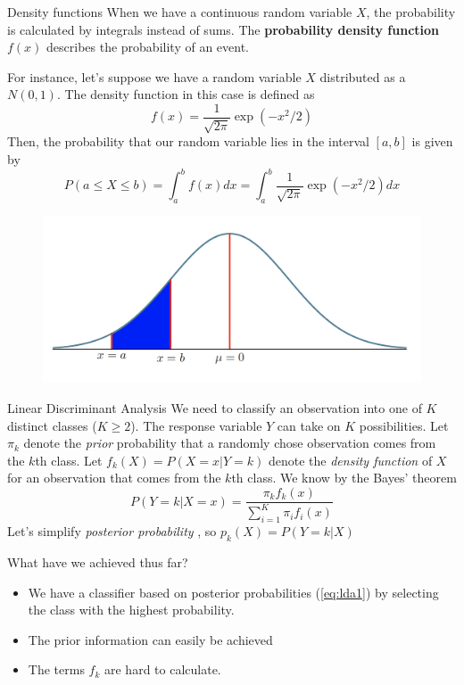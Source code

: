 \documentclass{beamer}
\begin{document}
\begin{frame}{Density functions}
	When we have a continuous random variable $X$, the probability is calculated by integrals instead of sums. The {\bf probability density function} $f(x)$ describes the probability of an event. 
	
	For instance, let's suppose we have a random variable $X$ distributed as a $N(0,1)$. The density function in this case is defined as
	\begin{equation*}
		f(x)= \frac{1}{\sqrt{2\pi}} \exp(-x^2/2)
	\end{equation*}
Then, the probability that our random variable lies in the interval  $[a,b]$ is given by
\begin{equation*}
		P(a \le X \le b)= \int_a^b f(x)dx = \int_a^b  \frac{1}{\sqrt{2\pi}} \exp(-x^2/2) dx
\end{equation*}
 \begin{figure}[h]
	\centering
	\includegraphics[scale=0.3]{../../Figures/fig_density.png}
\end{figure}

\end{frame}

\begin{frame}{Linear Discriminant Analysis}
	We need to classify an observation into one of $K$ distinct classes ($K\ge 2$). The response variable $Y$ can take on $K$ possibilities. Let $\pi_k$ denote the {\it prior} probability that a randomly chose observation comes from the $k$th class. Let $f_k(X)= P(X=x|Y=k)$ denote the {\it density function} of $X$ for an observation that comes from the $k$th class. We know by the Bayes' theorem
	\begin{equation}
		P(Y=k| X=x)= \frac{\pi_k f_k(x)}{\sum_{i=1}^K \pi_i f_i(x)}
		\label{eq:lda1}
	\end{equation}
 	Let's simplify  {\it posterior probability} , so $p_k(X)=P(Y=k|X)$ 
	
	What have we achieved thus far?
	\begin{itemize}
		\item We have a classifier based on posterior probabilities (\ref{eq:lda1}) by selecting the class with the highest probability. 
		\item The prior information can easily be achieved
		\item The terms $f_k$ are hard to calculate.
	\end{itemize}
\end{frame}
\end{document}
